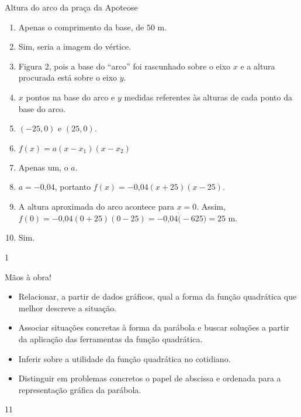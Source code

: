 \clearmargin
\begin{answer}{Altura do arco da praça da Apoteose}
{
\begin{enumerate}
\item {} 
Apenas o comprimento da base, de \(50\) m.

\item {} 
Sim, seria a imagem do vértice.

\item {} 
Figura 2, pois a base do “arco” foi rascunhado sobre o eixo \(x\) e a altura procurada está sobre o eixo \(y\).

\item {} 
\(x\) pontos na base do arco e \(y\) medidas referentes às alturas de cada ponto da base do arco.

\item {} 
\((-25,0)\) e \((25,0)\).

\item {} 
\(f(x)=a(x-x_1)(x-x_2)\)

\item {} 
Apenas um, o \(a\).

\item {} 
\(a=-0\text{,}04\), portanto \(f(x)=-0\text{,}04(x+25)(x-25)\).

\item {} 
A altura aproximada do arco acontece para \(x=0\). Assim, \(f(0)=-0\text{,}04(0+25)(0-25)=-0\text{,}04 \dot (-625)=25\) m.

\item {} 
Sim.

\end{enumerate}
}{1}
\end{answer}
\clearmargin
\begin{objectives}{Mãos à obra!}
{
\begin{itemize}
\item Relacionar, a partir de dados gráficos, qual a forma da função quadrática que melhor descreve a situação.

\item {} 
Associar situações concretas à forma da parábola e buscar soluções a partir da aplicação das ferramentas da função quadrática.

\item {} 
Inferir sobre a utilidade da função quadrática no cotidiano.

\item {} 
Distinguir em problemas concretos o papel de abscissa e ordenada para a representação gráfica da parábola.
\end{itemize}
}{1}{1}
\end{objectives}

